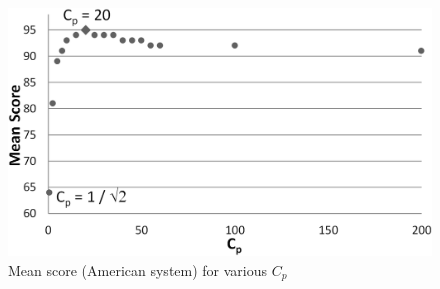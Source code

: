 \documentclass[letterpaper]{article}
\begin{document}


\begin{figure}[t]
\begin{center}
\includegraphics[width=1\linewidth]{images/Cp.png}
\end{center}
\caption{Mean score (American system) for various $C_p$}
\label{fig:Cp}
\end{figure}
\end{document}
